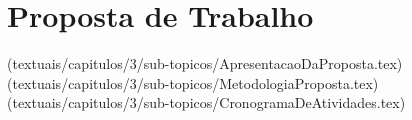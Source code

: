 

\newpage

\chapter{Proposta de Trabalho}
\label{cha:proposta-trabalho}

\markright{}

(textuais/capitulos/3/sub-topicos/ApresentacaoDaProposta.tex)
(textuais/capitulos/3/sub-topicos/MetodologiaProposta.tex)
(textuais/capitulos/3/sub-topicos/CronogramaDeAtividades.tex)

